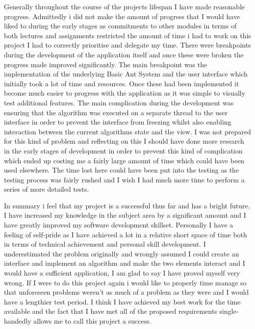 Generally throughout the course of the projects lifespan I have made reasonable progress. Admittedly i did not make the amount of progress that I would have liked to during the early stages as commitments to other modules in terms of both lectures and assignments restricted the amount of time i had to work on this project I had to correctly prioritise and delegate my time. There were breakpoints during the development of the application itself and once these were broken the progress made improved significantly. The main breakpoint was the implementation of the underlying Basic Ant System and the user interface which initially took a lot of time and resources. Once these had been implemented it become much easier to progress with the application as it was simple to visually test additional features. The main complication during the development was ensuring that the algorithm was executed on a separate thread to the user interface in order to prevent the interface from freezing whilst also enabling interaction between the current algorithms state and the view. I was not prepared for this kind of problem and reflecting on this I should have done more research in the early stages of development in order to prevent this kind of complication which ended up costing me a fairly large amount of time which could have been used elsewhere. The time lost here could have been put into the testing as the testing process was fairly rushed and I wish I had much more time to perform a series of more detailed tests.

In summary i feel that my project is a successful thus far and has a bright future. I have increased my knowledge in the subject area by a significant amount and I have greatly improved my software development skillset. Personally I have a feeling of self-pride as I have achieved a lot in a relative short space of time both in terms of technical achievement and personal skill development. I underestimated the problem originally and wrongly assumed I could create an interface and implement an algorithm and make the two elements interact and I would have a sufficient application, I am glad to say I have proved myself very wrong. If I were to do this project again i would like to properly time manage so that unforeseen problems weren’t as much of a problem as they were and I would have a lengthier test period. I think I have achieved my best work for the time available and the fact that I have met all of the proposed requirements single-handedly allows me to call this project a success.